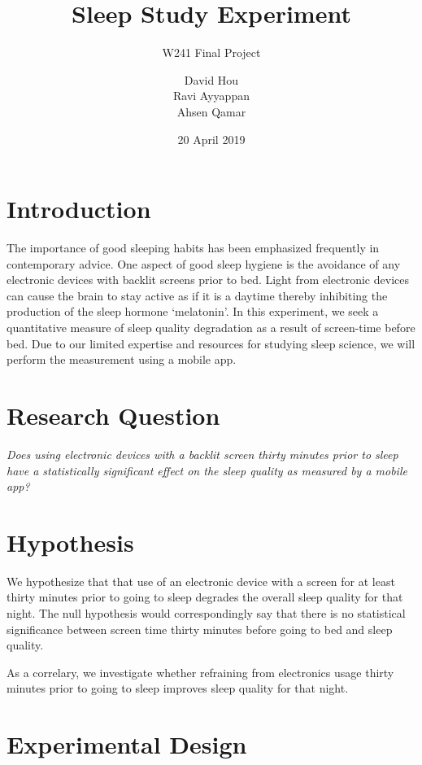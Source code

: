 \documentclass[12pt,]{article}
\title{Sleep Study Experiment}
\subtitle{W241 Final Project}
\author{David Hou \\ Ravi Ayyappan \\ Ahsen Qamar}
\date{20 April 2019}
\begin{document}
\maketitle

\section{Introduction}\label{introduction}

The importance of good sleeping habits has been emphasized frequently in
contemporary advice. One aspect of good sleep hygiene is the avoidance
of any electronic devices with backlit screens prior to bed. Light from
electronic devices can cause the brain to stay active as if it is a
daytime thereby inhibiting the production of the sleep hormone
`melatonin'. In this experiment, we seek a quantitative measure of sleep
quality degradation as a result of screen-time before bed. Due to our
limited expertise and resources for studying sleep science, we will
perform the measurement using a mobile app.

\section{Research Question}\label{research-question}

\emph{Does using electronic devices with a backlit screen thirty minutes
prior to sleep have a statistically significant effect on the sleep
quality as measured by a mobile app?}

\section{Hypothesis}\label{hypothesis}

We hypothesize that that use of an electronic device with a screen for
at least thirty minutes prior to going to sleep degrades the overall
sleep quality for that night. The null hypothesis would correspondingly
say that there is no statistical significance between screen time thirty
minutes before going to bed and sleep quality.

As a correlary, we investigate whether refraining from electronics usage
thirty minutes prior to going to sleep improves sleep quality for that
night.

\section{Experimental Design}\label{experimental-design}
\end{document}
